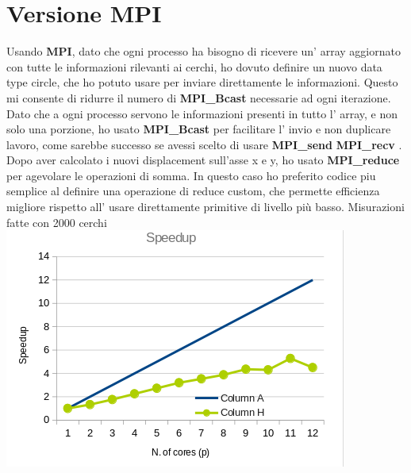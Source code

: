 \documentclass[a4paper,12pt, twoside]{report}
\begin{document}
\section*{Versione MPI}
Usando \textbf{MPI}\cite{mpi}, dato che ogni processo ha bisogno di ricevere un' array aggiornato con tutte le informazioni rilevanti ai cerchi, 
ho dovuto definire un nuovo data type circle, che ho potuto usare per inviare direttamente le informazioni. 
Questo mi consente di ridurre il numero di  \textbf{MPI\_Bcast} \cite{mpi_bcast} necessarie ad ogni iterazione. Dato che a ogni processo servono le
informazioni presenti in tutto l' array, e non solo una porzione, ho usato \textbf{MPI\_Bcast}\cite{mpi_bcast} per facilitare l' invio e non duplicare lavoro,
come sarebbe successo se avessi scelto di usare \textbf{MPI\_send} \cite{mpi_send} \textbf{MPI\_recv} \cite{mpi_recv}. 
Dopo aver calcolato i nuovi displacement sull'asse x e y, ho usato \textbf{MPI\_reduce} \cite{mpi_reduce} per agevolare le operazioni di somma.
In questo caso ho preferito codice piu semplice al definire una operazione di reduce custom,
che permette efficienza migliore rispetto all' usare direttamente primitive di livello più basso.
Misurazioni fatte con 2000 cerchi
\newline
\includegraphics[scale=0.5]{images/mpi_speedup.png}
\end{document}

